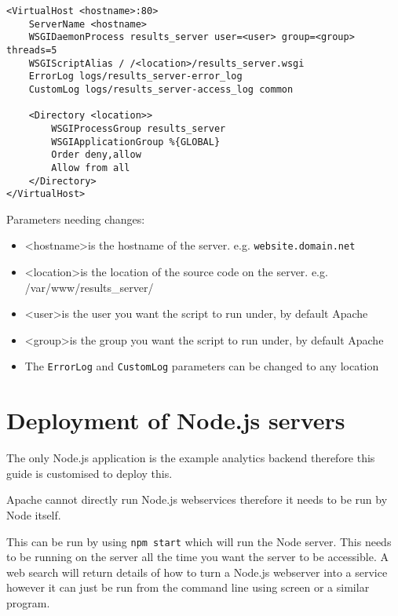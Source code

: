 \begin{lstlisting}[caption={Apache configuration}, label={code:apacheConfig_flask}]
<VirtualHost <hostname>:80>
	ServerName <hostname>
	WSGIDaemonProcess results_server user=<user> group=<group> threads=5
	WSGIScriptAlias / /<location>/results_server.wsgi
	ErrorLog logs/results_server-error_log
	CustomLog logs/results_server-access_log common

	<Directory <location>>
		WSGIProcessGroup results_server
		WSGIApplicationGroup %{GLOBAL}
		Order deny,allow
		Allow from all
	</Directory>
</VirtualHost>
\end{lstlisting}

\newpage
Parameters needing changes:

\begin{itemize}
\item \textless hostname\textgreater is the hostname of the server. e.g. \lstinline|website.domain.net|
\item \textless location\textgreater is the location of the source code on the server. e.g. /var/www/results\_server/
\item \textless user\textgreater is the user you want the script to run under, by default Apache
\item \textless group\textgreater is the group you want the script to run under, by default Apache
\item The \lstinline|ErrorLog| and \lstinline|CustomLog| parameters can be changed to any location

\end{itemize}

\section{Deployment of Node.js servers} \label{Section:Deployment of Node.js Servers}

The only Node.js application is the example analytics backend therefore this guide is customised to deploy this.

Apache cannot directly run Node.js webservices therefore it needs to be run by Node itself.

This can be run by using \lstinline|npm start| which will run the Node server. This needs to be running on the server all the time you want the server to be accessible.
A web search will return details of how to turn a Node.js webserver into a service however it can just be run from the command line using screen or a similar program.

